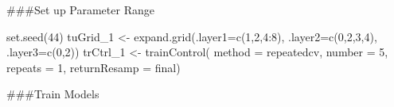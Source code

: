 \documentclass[
]{article}
\newenvironment{Shaded}{\begin{snugshade}}{\end{snugshade}}
\newcommand{\AttributeTok}[1]{\textcolor[rgb]{0.77,0.63,0.00}{#1}}
\newcommand{\DecValTok}[1]{\textcolor[rgb]{0.00,0.00,0.81}{#1}}
\newcommand{\FunctionTok}[1]{\textcolor[rgb]{0.00,0.00,0.00}{#1}}
\newcommand{\NormalTok}[1]{#1}
\newcommand{\OtherTok}[1]{\textcolor[rgb]{0.56,0.35,0.01}{#1}}
\newcommand{\SpecialCharTok}[1]{\textcolor[rgb]{0.00,0.00,0.00}{#1}}
\newcommand{\StringTok}[1]{\textcolor[rgb]{0.31,0.60,0.02}{#1}}
\begin{document}
\#\#\#Set up Parameter Range

\begin{Shaded}
\begin{Highlighting}[]
\FunctionTok{set.seed}\NormalTok{(}\DecValTok{44}\NormalTok{)}
\NormalTok{tuGrid\_1 }\OtherTok{\textless{}{-}} \FunctionTok{expand.grid}\NormalTok{(}\AttributeTok{.layer1=}\FunctionTok{c}\NormalTok{(}\DecValTok{1}\NormalTok{,}\DecValTok{2}\NormalTok{,}\DecValTok{4}\SpecialCharTok{:}\DecValTok{8}\NormalTok{), }\AttributeTok{.layer2=}\FunctionTok{c}\NormalTok{(}\DecValTok{0}\NormalTok{,}\DecValTok{2}\NormalTok{,}\DecValTok{3}\NormalTok{,}\DecValTok{4}\NormalTok{), }\AttributeTok{.layer3=}\FunctionTok{c}\NormalTok{(}\DecValTok{0}\NormalTok{,}\DecValTok{2}\NormalTok{))}
\NormalTok{trCtrl\_1 }\OtherTok{\textless{}{-}} \FunctionTok{trainControl}\NormalTok{(}
  \AttributeTok{method =} \StringTok{\textquotesingle{}repeatedcv\textquotesingle{}}\NormalTok{,}
  \AttributeTok{number =} \DecValTok{5}\NormalTok{,}
  \AttributeTok{repeats =} \DecValTok{1}\NormalTok{,}
  \AttributeTok{returnResamp =} \StringTok{\textquotesingle{}final\textquotesingle{}}\NormalTok{)}
\end{Highlighting}
\end{Shaded}

\#\#\#Train Models
\end{document}
